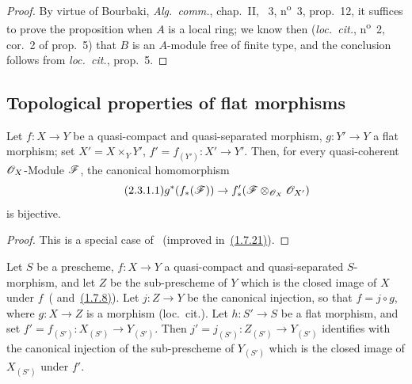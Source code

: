 \begin{proof}
By virtue of Bourbaki, \emph{Alg.~comm.}, chap.~II, \textsection~3, n\textsuperscript{o}~3, prop.~12, it suffices to prove the proposition when $A$ is a local ring; we know then (\emph{loc.~cit.}, n\textsuperscript{o}~2, cor.~2 of prop.~5) that $B$ is an $A$-module free of finite type, and the conclusion follows from \emph{loc.~cit.}, prop.~5.
\end{proof}

\subsection{Topological properties of flat morphisms}
\label{subsection:IV.2.3}

\begin{lemma}[2.3.1]
\label{IV.2.3.1}
Let $f:X\to Y$ be a quasi-compact and quasi-separated morphism, $g:Y'\to Y$ a flat morphism; set $X'=X\times_Y Y'$, $f'=f_{(Y')}:X'\to Y'$.
Then, for every quasi-coherent $\mathscr{O}_X$-Module $\mathscr{F}$, the canonical homomorphism
\begin{equation}
\tag{2.3.1.1}
\label{IV.2.3.1.1}
  g^*(f_*(\mathscr{F})) \to f'_*(\mathscr{F}\otimes_{\mathscr{O}_X}\mathscr{O}_{X'})
\end{equation}
is bijective.
\end{lemma}

\begin{proof}
This is a special case of~ (improved in~{\hyperref[IV.1.7.21]{(1.7.21)}}).
\end{proof}

\begin{proposition}[2.3.2]
\label{IV.2.3.2}
Let $S$ be a prescheme, $f:X\to Y$ a quasi-compact and quasi-separated $S$-morphism, and let $Z$ be the sub-prescheme of $Y$ which is the closed image of $X$ under $f$~\textnormal{(} and~{\hyperref[IV.1.7.8]{(1.7.8)}}\textnormal{)}.
Let $j:Z\to Y$ be the canonical injection, so that $f=j\circ g$, where $g:X\to Z$ is a morphism \textnormal{(}loc.~cit.\textnormal{)}.
Let $h:S'\to S$ be a flat morphism, and set $f'=f_{(S')}:X_{(S')}\to Y_{(S')}$.
Then $j'=j_{(S')}:Z_{(S')}\to Y_{(S')}$ identifies with the canonical injection of the sub-prescheme of $Y_{(S')}$ which is the closed image of $X_{(S')}$ under $f'$.
\end{proposition}

